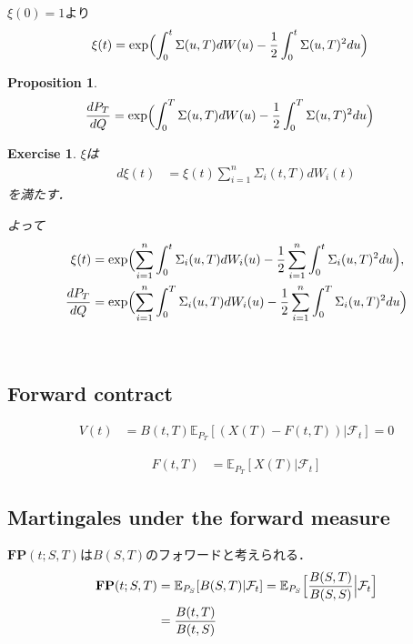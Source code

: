 \documentclass[11pt, a4paper]{jsarticle}
\newcommand{\E}{\mathbb{E}}
\newcommand{\FP}{\textbf{FP}}
\newtheorem{proposition}[assumption]{Proposition}
\newtheorem{exercise}{Exercise}[section]
\begin{document}
$\xi(0) = 1$より
\begin{align}
\xi(t)
& =
\exp \Bigl( \int_0^t \Sigma(u, T) dW(u) - \frac{1}{2} \int_0^t \Sigma(u, T)^2 du \Bigr) \nonumber
\end{align}

\begin{proposition}
\begin{align}
\frac{dP_T}{dQ}
& =
\exp \Bigl( \int_0^T \Sigma(u, T) dW(u) - \frac{1}{2} \int_0^T \Sigma(u, T)^2 du \Bigr) \nonumber
\end{align}
\end{proposition}

\hrulefill
\begin{exercise}
$\xi$は
\begin{align}
d \xi(t)
& =
\xi(t) \sum_{i=1}^n \Sigma_i(t, T) dW_i(t) \nonumber
\end{align}
を満たす．

よって
\begin{align}
\xi(t)
& =
\exp \Bigl( \sum_{i=1}^n \int_0^t \Sigma_i(u, T) dW_i(u) - \frac{1}{2} \sum_{i=1}^n \int_0^t \Sigma_i(u, T)^2 du \Bigr), \nonumber \\
\frac{dP_T}{dQ}
& =
\exp \Bigl( \sum_{i=1}^n \int_0^T \Sigma_i(u, T) dW_i(u) - \frac{1}{2} \sum_{i=1}^n \int_0^T \Sigma_i(u, T)^2 du \Bigr) \nonumber
\end{align}
\end{exercise}
\hrulefill \\

\subsection{Forward contract}
\begin{align}
V(t)
& =
B(t, T) \E_{P_T} [ (X(T) - F(t, T)) | \mathcal{F}_t ]
= 0 \nonumber
\end{align}

\begin{align}
F(t, T)
& =
\E_{P_T} [ X(T) | \mathcal{F}_t ] \nonumber
\end{align}

\subsection{Martingales under the forward measure}
$\FP(t; S, T)$は$B(S, T)$のフォワードと考えられる．
\begin{align}
\FP(t; S, T)
& =
\E_{P_S} [ B(S, T) | \mathcal{F}_t ]
= \E_{P_S} \Bigl[ \frac{B(S, T)}{B(S, S)} \Bigl| \mathcal{F}_t \Bigr] \nonumber \\
& =
\frac{B(t, T)}{B(t, S)} \nonumber
\end{align}
\end{document}
